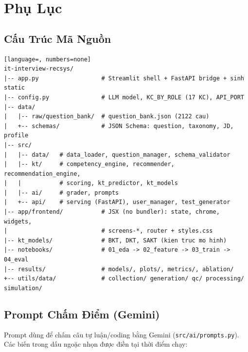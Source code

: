 \chapter{Phụ Lục}
\label{chap:appendix}

\section{Cấu Trúc Mã Nguồn}
\label{apx:repo}

\begin{lstlisting}[language=, numbers=none]
it-interview-recsys/
|-- app.py                  # Streamlit shell + FastAPI bridge + sinh static
|-- config.py               # LLM model, KC_BY_ROLE (17 KC), API_PORT
|-- data/
|   |-- raw/question_bank/  # question_bank.json (2122 cau)
|   +-- schemas/            # JSON Schema: question, taxonomy, JD, profile
|-- src/
|   |-- data/   # data_loader, question_manager, schema_validator
|   |-- kt/     # competency_engine, recommender, recommendation_engine,
|   |           # scoring, kt_predictor, kt_models
|   |-- ai/     # grader, prompts
|   +-- api/    # serving (FastAPI), user_manager, test_generator
|-- app/frontend/           # JSX (no bundler): state, chrome, widgets,
|                           # screens-*, router + styles.css
|-- kt_models/              # BKT, DKT, SAKT (kien truc mo hinh)
|-- notebooks/              # 01_eda -> 02_feature -> 03_train -> 04_eval
|-- results/                # models/, plots/, metrics/, ablation/
+-- utils/data/             # collection/ generation/ qc/ processing/ simulation/
\end{lstlisting}

\section{Prompt Chấm Điểm (Gemini)}
\label{apx:prompt}

Prompt dùng để chấm câu tự luận/coding bằng Gemini (\texttt{src/ai/prompts.py}). Các biến trong dấu ngoặc nhọn được điền tại thời điểm chạy:

